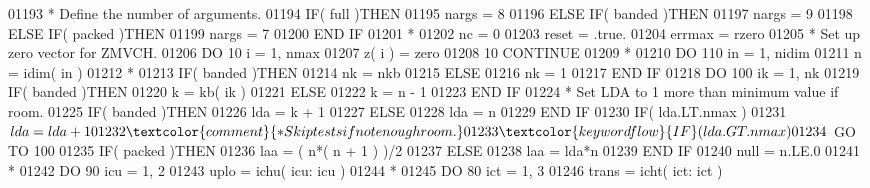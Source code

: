 \begin{DoxyCode}
01193 \textcolor{comment}{*     Define the number of arguments.}
01194       \textcolor{keywordflow}{IF}( full )\textcolor{keywordflow}{THEN}
01195          nargs = 8
01196       \textcolor{keywordflow}{ELSE} \textcolor{keywordflow}{IF}( banded )\textcolor{keywordflow}{THEN}
01197          nargs = 9
01198       \textcolor{keywordflow}{ELSE} \textcolor{keywordflow}{IF}( packed )\textcolor{keywordflow}{THEN}
01199          nargs = 7
01200 \textcolor{keywordflow}{      END IF}
01201 \textcolor{comment}{*}
01202       nc = 0
01203       reset = .true.
01204       errmax = rzero
01205 \textcolor{comment}{*     Set up zero vector for ZMVCH.}
01206       \textcolor{keywordflow}{DO} 10 i = 1, nmax
01207          z( i ) = zero
01208    10 \textcolor{keywordflow}{CONTINUE}
01209 \textcolor{comment}{*}
01210       \textcolor{keywordflow}{DO} 110 in = 1, nidim
01211          n = idim( in )
01212 \textcolor{comment}{*}
01213          \textcolor{keywordflow}{IF}( banded )\textcolor{keywordflow}{THEN}
01214             nk = nkb
01215          \textcolor{keywordflow}{ELSE}
01216             nk = 1
01217 \textcolor{keywordflow}{         END IF}
01218          \textcolor{keywordflow}{DO} 100 ik = 1, nk
01219             \textcolor{keywordflow}{IF}( banded )\textcolor{keywordflow}{THEN}
01220                k = kb( ik )
01221             \textcolor{keywordflow}{ELSE}
01222                k = n - 1
01223 \textcolor{keywordflow}{            END IF}
01224 \textcolor{comment}{*           Set LDA to 1 more than minimum value if room.}
01225             \textcolor{keywordflow}{IF}( banded )\textcolor{keywordflow}{THEN}
01226                lda = k + 1
01227             \textcolor{keywordflow}{ELSE}
01228                lda = n
01229 \textcolor{keywordflow}{            END IF}
01230             \textcolor{keywordflow}{IF}( lda.LT.nmax )
01231      $         lda = lda + 1
01232 \textcolor{comment}{*           Skip tests if not enough room.}
01233             \textcolor{keywordflow}{IF}( lda.GT.nmax )
01234      $         \textcolor{keywordflow}{GO TO} 100
01235             \textcolor{keywordflow}{IF}( packed )\textcolor{keywordflow}{THEN}
01236                laa = ( n*( n + 1 ) )/2
01237             \textcolor{keywordflow}{ELSE}
01238                laa = lda*n
01239 \textcolor{keywordflow}{            END IF}
01240             null = n.LE.0
01241 \textcolor{comment}{*}
01242             \textcolor{keywordflow}{DO} 90 icu = 1, 2
01243                uplo = ichu( icu: icu )
01244 \textcolor{comment}{*}
01245                \textcolor{keywordflow}{DO} 80 ict = 1, 3
01246                   trans = icht( ict: ict )

\end{DoxyCode}
